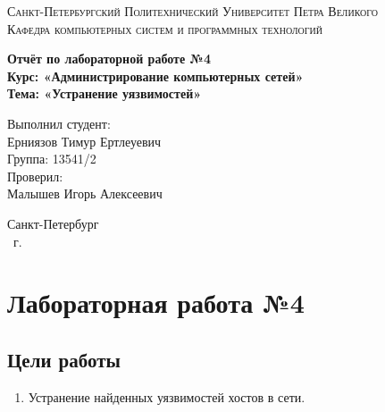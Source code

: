 \documentclass[14pt,a4paper,report]{report}
\begin{document}
\def\contentsname{Содержание}

\begin{titlepage}
	\begin{center}
		\textsc{Санкт-Петербургский Политехнический 
			Университет Петра Великого\\[5mm]
			Кафедра компьютерных систем и программных технологий}
		
		\vfill
		
		\textbf{Отчёт по лабораторной работе №4\\[3mm]
			Курс: «Администрирование компьютерных сетей»\\[3mm]
			Тема: «Устранение уязвимостей»\\[35mm]
			}
	\end{center}
	
	\hfill
	\begin{minipage}{.5\textwidth}
		Выполнил студент:\\[2mm] 
		Ерниязов Тимур Ертлеуевич\\
		Группа: 13541/2\\[5mm]
		
		Проверил:\\[2mm] 
		Малышев Игорь Алексеевич
	\end{minipage}
	\vfill
	\begin{center}
		Санкт-Петербург\\ \the\year\ г.
	\end{center}
\end{titlepage}

\tableofcontents
\clearpage

\chapter{Лабораторная работа №4}
\section{Цели работы}
\begin{enumerate}
\item Устранение найденных уязвимостей хостов в сети.
\end{enumerate}
\end{document}
